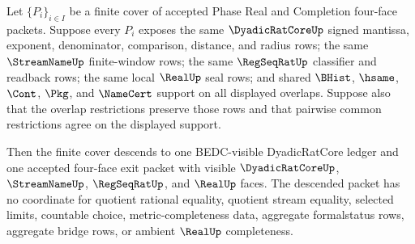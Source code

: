 \begin{theorem}
\label{thm:dyadicratcore-l10-exit-ledger-finite-cover-descent}
Let $\{P_i\}_{i\in I}$ be a finite cover of accepted Phase Real and Completion four-face packets. Suppose every $P_i$ exposes the same $\DyadicRatCoreUp$ signed mantissa, exponent, denominator, comparison, distance, and radius rows; the same $\StreamNameUp$ finite-window rows; the same $\RegSeqRatUp$ classifier and readback rows; the same local $\RealUp$ seal rows; and shared $\BHist$, $\hsame$, $\Cont$, $\Pkg$, and $\NameCert$ support on all displayed overlaps. Suppose also that the overlap restrictions preserve those rows and that pairwise common restrictions agree on the displayed support.

Then the finite cover descends to one BEDC-visible DyadicRatCore ledger and one accepted four-face exit packet with visible $\DyadicRatCoreUp$, $\StreamNameUp$, $\RegSeqRatUp$, and $\RealUp$ faces. The descended packet has no coordinate for quotient rational equality, quotient stream equality, selected limits, countable choice, metric-completeness data, aggregate formalstatus rows, aggregate bridge rows, or ambient $\RealUp$ completeness.
\end{theorem}

